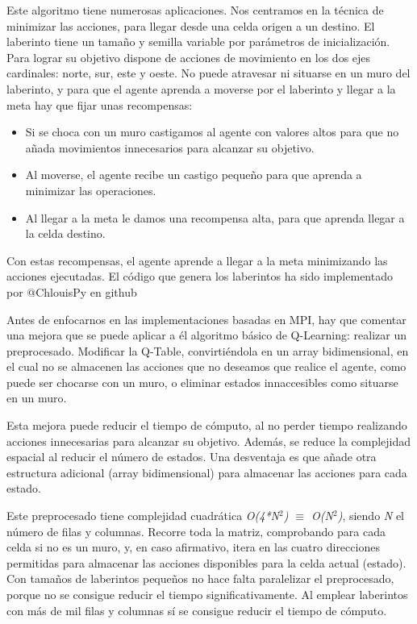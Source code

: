 		Este algoritmo tiene numerosas aplicaciones. Nos centramos en la técnica de minimizar las acciones, para llegar desde una celda origen a un destino. El laberinto tiene un tamaño y semilla variable por parámetros de inicialización. Para lograr su objetivo dispone de acciones de movimiento en los dos ejes cardinales: norte, sur, este y oeste. No puede atravesar ni situarse en un muro del laberinto, y para que el agente aprenda a moverse por el laberinto y llegar a la meta hay que fijar unas recompensas:
		\begin{itemize}
			\item Si se choca con un muro castigamos al agente con valores altos para que no añada movimientos innecesarios para alcanzar su objetivo.
			\vspace*{-0.2cm}
			\item Al moverse, el agente recibe un castigo pequeño para que aprenda a minimizar las operaciones.
			\vspace*{-0.2cm}
			\item Al llegar a la meta le damos una recompensa alta, para que aprenda llegar a la celda destino. 					
		\end{itemize}
	
		Con estas recompensas, el agente aprende a llegar a la meta minimizando las acciones ejecutadas. El código que genera los laberintos ha sido implementado por @ChlouisPy en github\cite{MazeGenerator}


		Antes de enfocarnos en las implementaciones basadas en MPI, hay que comentar una mejora que se puede aplicar a él algoritmo básico de Q-Learning: realizar un preprocesado. Modificar la Q-Table, convirtiéndola en un array bidimensional, en el cual no se almacenen las acciones que no deseamos que realice el agente, como puede ser chocarse con un muro, o eliminar estados innaccesibles como situarse en un muro.
		
		Esta mejora puede reducir el tiempo de cómputo, al no perder tiempo realizando acciones innecesarias para alcanzar su objetivo. Además, se reduce la complejidad espacial al reducir el número de estados. Una desventaja es que añade otra estructura adicional (array bidimensional) para almacenar las acciones para cada estado. 
		
		Este preprocesado tiene complejidad cuadrática \textit{O(4*N\(^{2}\)) $\equiv$ O(N\(^{2}\))}, siendo \textit{N} el número de filas y columnas. Recorre toda la matriz, comprobando para cada celda si no es un muro, y, en caso afirmativo, itera en las cuatro direcciones permitidas para almacenar las acciones disponibles para la celda actual (estado). Con tamaños de laberintos pequeños no hace falta paralelizar el preprocesado, porque no se consigue reducir el tiempo significativamente. Al emplear laberintos con más de mil filas y columnas sí se consigue reducir el tiempo de cómputo.
		
